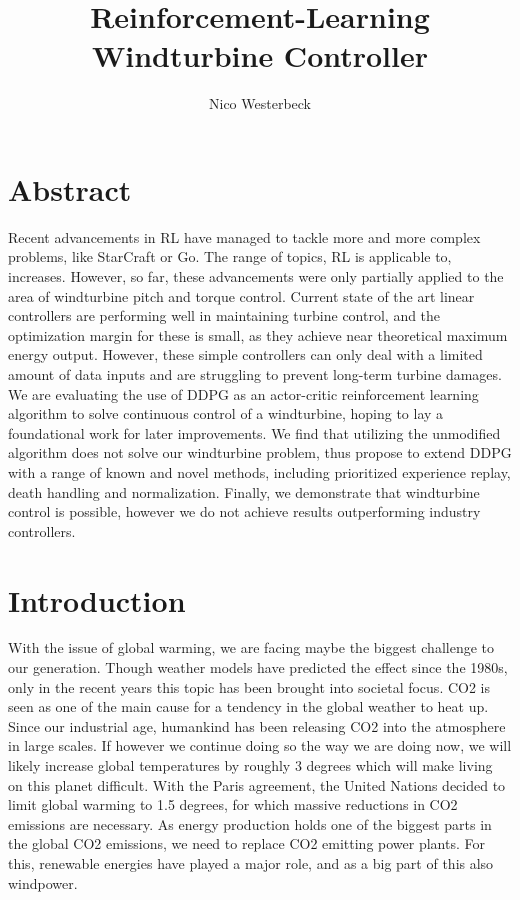 \documentclass[hyperref,final,beleg]{cgvpub}
\author{Nico Westerbeck}
\title{Reinforcement-Learning Windturbine Controller}
\begin{document}
\chapter{Abstract}

Recent advancements in \ac{RL} have managed to tackle more and more complex problems, like StarCraft or Go. The range of topics, \ac{RL} is applicable to, increases. However, so far, these advancements were only partially applied to the area of windturbine pitch and torque control. Current state of the art linear controllers are performing well in maintaining turbine control, and the optimization margin for these is small, as they achieve near theoretical maximum energy output. However, these simple controllers can only deal with a limited amount of data inputs and are struggling to prevent long-term turbine damages. We are evaluating the use of DDPG as an actor-critic reinforcement learning algorithm to solve continuous control of a windturbine, hoping to lay a foundational work for later improvements. We find that utilizing the unmodified algorithm does not solve our windturbine problem, thus propose to extend DDPG with a range of known and novel methods, including prioritized experience replay, death handling and normalization. Finally, we demonstrate that windturbine control is possible, however we do not achieve results outperforming industry controllers.

\chapter{Introduction}

With the issue of global warming, we are facing maybe the biggest challenge to our generation. Though weather models have predicted the effect since the 1980s, only in the recent years this topic has been brought into societal focus. CO2 is seen as one of the main cause for a tendency in the global weather to heat up. Since our industrial age, humankind has been releasing CO2 into the atmosphere in large scales. If however we continue doing so the way we are doing now, we will likely increase global temperatures by roughly 3 degrees which will make living on this planet difficult. With the Paris agreement, the United Nations decided to limit global warming to 1.5 degrees, for which massive reductions in CO2 emissions are necessary. As energy production holds one of the biggest parts in the global CO2 emissions, we need to replace CO2 emitting power plants. For this, renewable energies have played a major role, and as a big part of this also windpower.
\end{document}
